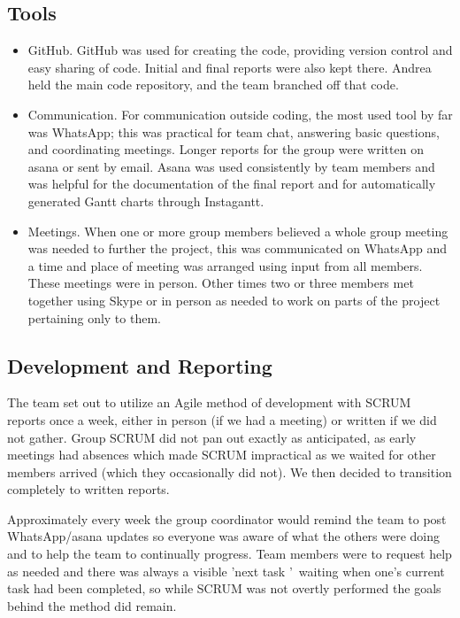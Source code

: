 \documentclass[11pt]{article}
\begin{document}
\begin{enumerate}
\subsection{Tools}

\begin{itemize}\itemsep0pt
\item GitHub. GitHub was used for creating the code, providing version control and easy sharing of code. Initial and final reports were also kept there. Andrea held the main code repository, and the team branched off that code.
\item Communication. For communication outside coding, the most used tool by far was WhatsApp; this was practical for team chat, answering basic questions, and coordinating meetings. Longer reports for the group were written on asana or sent by email. Asana was used consistently by team members and was helpful for the documentation of the final report and for automatically generated Gantt charts through Instagantt.
\item Meetings. When one or more group members believed a whole group meeting was needed to further the project, this was communicated on WhatsApp and a time and place of meeting was arranged using input from all members. These meetings were in person. Other times two or three members met together using Skype or in person as needed to work on parts of the project pertaining only to them.
\end{itemize}



\subsection{Development and Reporting}

The team set out to utilize an Agile method of development with SCRUM reports once a week, either in person (if we had a meeting) or written if we did not gather. Group SCRUM did not pan out exactly as anticipated, as early meetings had absences which made SCRUM impractical as we waited for other members arrived (which they occasionally did not). We then decided to transition completely to written reports. 

Approximately every week the group coordinator would remind the team to post WhatsApp/asana updates so everyone was aware of what the others were doing and to help the team to continually progress. Team members were to request help as needed and there was always a visible \textquoteright next task \textquoteright\ waiting when one\textquoteright s current task had been completed, so while SCRUM was not overtly performed the goals behind the method did remain.



\end{enumerate}
\end{document}
